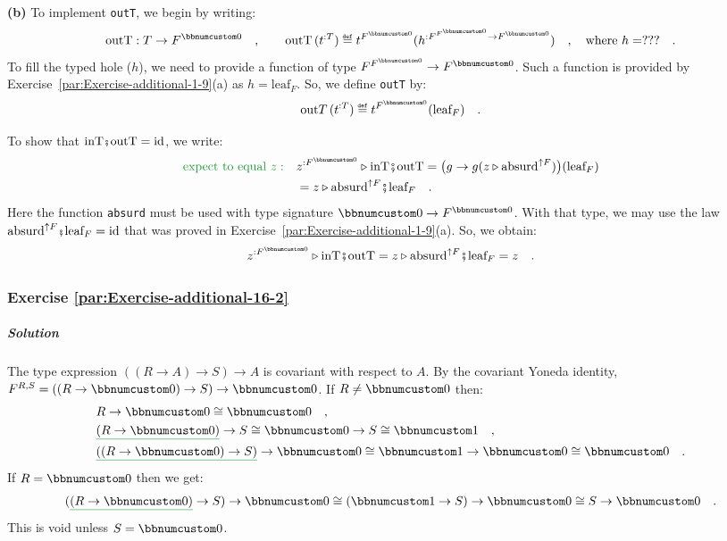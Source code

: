 \textbf{(b)} To implement \lstinline!outT!, we begin by writing:
\[
\text{outT}:T\rightarrow F^{\bbnum 0}\quad,\quad\quad\text{outT}\,(t^{:T})\triangleq t^{F^{\bbnum 0}}(h^{:F^{F^{\bbnum 0}}\rightarrow F^{\bbnum 0}})\quad,\quad\text{where }h=???\quad.
\]
To fill the typed hole ($h$), we need to provide a function of type
$F^{F^{\bbnum 0}}\rightarrow F^{\bbnum 0}$. Such a function is provided
by Exercise~\ref{par:Exercise-additional-1-9}(a) as $h=\text{leaf}_{F}$.
So, we define \lstinline!outT! by:
\[
\text{out}T\,(t^{:T})\triangleq t^{F^{\bbnum 0}}(\text{leaf}_{F})\quad.
\]

To show that $\text{inT}\bef\text{outT}=\text{id}$, we write:
\begin{align*}
{\color{greenunder}\text{expect to equal }z:}\quad & z^{:F^{\bbnum 0}}\triangleright\text{inT}\bef\text{outT}=\big(g\rightarrow g(z\triangleright\text{absurd}^{\uparrow F})\big)(\text{leaf}_{F})\\
 & =z\triangleright\text{absurd}^{\uparrow F}\bef\text{leaf}_{F}\quad.
\end{align*}
Here the function \lstinline!absurd! must be used with type signature
$\bbnum 0\rightarrow F^{\bbnum 0}$. With that type, we may use the
law $\text{absurd}^{\uparrow F}\bef\text{leaf}_{F}=\text{id}$ that
was proved in Exercise~\ref{par:Exercise-additional-1-9}(a). So,
we obtain:
\[
z^{:F^{\bbnum 0}}\triangleright\text{inT}\bef\text{outT}=z\triangleright\text{absurd}^{\uparrow F}\bef\text{leaf}_{F}=z\quad.
\]


\subsubsection*{Exercise \ref{par:Exercise-additional-16-2}}

\subparagraph{Solution }

The type expression $((R\rightarrow A)\rightarrow S)\rightarrow A$
is covariant with respect to $A$. By the covariant Yoneda identity,
$F^{R,S}=((R\rightarrow\bbnum 0)\rightarrow S)\rightarrow\bbnum 0$.
If $R\neq\bbnum 0$ then:
\begin{align*}
 & R\rightarrow\bbnum 0\cong\bbnum 0\quad,\\
 & \gunderline{(R\rightarrow\bbnum 0)}\rightarrow S\cong\bbnum 0\rightarrow S\cong\bbnum 1\quad,\\
 & \gunderline{((R\rightarrow\bbnum 0)\rightarrow S)}\rightarrow\bbnum 0\cong\bbnum 1\rightarrow\bbnum 0\cong\bbnum 0\quad.
\end{align*}
If $R=\bbnum 0$ then we get: 
\[
(\gunderline{(R\rightarrow\bbnum 0)}\rightarrow S)\rightarrow\bbnum 0\cong(\bbnum 1\rightarrow S)\rightarrow\bbnum 0\cong S\rightarrow\bbnum 0\quad.
\]
This is void unless $S=\bbnum 0$. 

